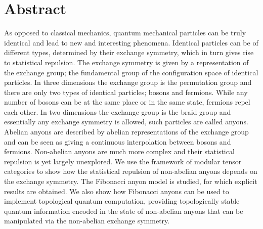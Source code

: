 
\chapter*{Abstract}

As opposed to classical mechanics, quantum mechanical particles can be truly identical and lead to new and interesting phenomena. Identical particles can be of different types, determined by their exchange symmetry, which in turn gives rise to statistical repulsion. The exchange symmetry is given by a representation of the exchange group; the fundamental group of the configuration space of identical particles. In three dimensions the exchange group is the permutation group and there are only two types of identical particles; bosons and fermions. While any number of bosons can be at the same place or in the same state, fermions repel each other. In two dimensions the exchange group is the braid group and essentially any exchange symmetry is allowed, such particles are called anyons. Abelian anyons are described by abelian representations of the exchange group and can be seen as giving a continuous interpolation between bosons and fermions. Non-abelian anyons are much more complex and their statistical repulsion is yet largely unexplored. We use the framework of modular tensor categories to show how the statistical repulsion of non-abelian anyons depends on the exchange symmetry.  The Fibonacci anyon model is studied, for which explicit results are obtained. We also show how Fibonacci anyons can be used to implement topological quantum computation, providing topologically stable quantum information encoded in the state of non-abelian anyons that can be manipulated via the non-abelian exchange symmetry.

\newpage



